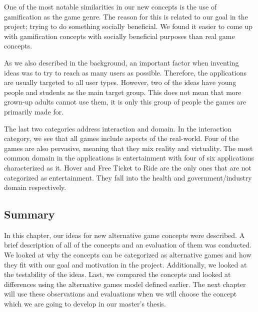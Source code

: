 \documentclass[../Main.tex]{subfiles}
\begin{document}
One of the most notable similarities in our new concepts is the use of gamification as the game genre. The reason for this is related to our goal in the project; trying to do something socially beneficial. We found it easier to come up with gamification concepts with socially beneficial purposes than real game concepts.

As we also described in the background, an important factor when inventing ideas was to try to reach as many users as possible. Therefore, the applications are usually targeted to all user types. However, two of the ideas have young people and students as the main target group. This does not mean that more grown-up adults cannot use them, it is only this group of people the games are primarily made for. 

The last two categories address interaction and domain. In the interaction category, we see that all games include aspects of the real-world. Four of the games are also pervasive, meaning that they mix reality and virtuality. The most common domain in the applications is entertainment with four of six applications characterized as it. Hover and Free Ticket to Ride are the only ones that are not categorized as entertainment. They fall into the health and government/industry domain respectively.

\subsection{Summary}
In this chapter, our ideas for new alternative game concepts were described. A brief description of all of the concepts and an evaluation of them was conducted. We looked at why the concepts can be categorized as alternative games and how they fit with our goal and motivation in the project. Additionally, we looked at the testability of the ideas. Last, we compared the concepts and looked at differences using the alternative games model defined earlier. The next chapter will use these observations and evaluations when we will choose the concept which we are going to develop in our master’s thesis.

\biblio %
\end{document}
